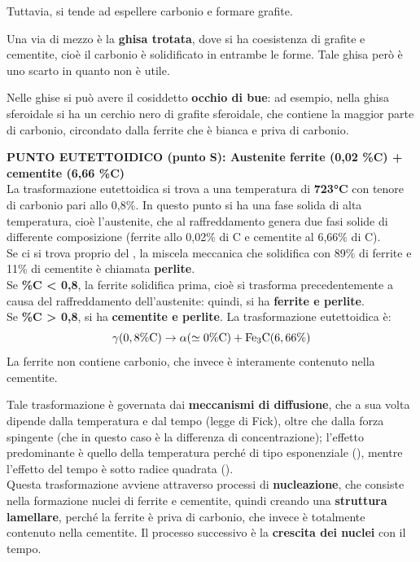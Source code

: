 Tuttavia, si tende ad espellere carbonio e formare grafite.

Una via di mezzo è la \textbf{ghisa trotata}, dove si ha coesistenza di grafite e cementite, cioè il carbonio è solidificato in entrambe le forme. Tale ghisa però è uno scarto in quanto non è utile.

Nelle ghise si può avere il cosiddetto \textbf{occhio di bue}: ad esempio, nella ghisa sferoidale si ha un cerchio nero di grafite sferoidale, che contiene la maggior parte di carbonio, circondato dalla ferrite che è bianca e priva di carbonio.

\textbf{PUNTO EUTETTOIDICO (punto S): Austenite \mathtext{\boldsymbol\gamma \to} ferrite \mathtext{\boldsymbol\alpha} (0,02 \%C) + cementite  (6,66 \%C)}\\
La trasformazione eutettoidica si trova a una temperatura di \textbf{723°C} con tenore di carbonio pari allo 0,8\%. In questo punto si ha una fase solida di alta temperatura, cioè l’austenite, che al raffreddamento genera due fasi solide di differente composizione (ferrite allo 0,02\% di C e cementite al 6,66\% di C).\\
Se ci si trova proprio del , la miscela meccanica che solidifica con 89\% di ferrite e 11\% di cementite è chiamata \textbf{perlite}.\\ 
Se \textbf{\%C < 0,8}, la ferrite \mathtext{\alpha} solidifica prima, cioè si trasforma precedentemente a causa del raffreddamento dell’austenite: quindi, si ha \textbf{ferrite e perlite}.\\
Se \textbf{\%C > 0,8}, si ha \textbf{cementite e perlite}. La trasformazione eutettoidica è:
\begin{equation*}
    \gamma(0,8\%\mbox{$\mathrm{C}$})\to\alpha(\simeq0\%\mbox{$\mathrm{C}$})+\mbox{$\mathrm{Fe_3C(6,66\%)}$}
\end{equation*}
La ferrite \mathtext{\alpha} non contiene carbonio, che invece è interamente contenuto nella cementite.

Tale trasformazione è governata dai \textbf{meccanismi di diffusione}, che a sua volta dipende dalla temperatura e dal tempo (legge di Fick), oltre che dalla forza spingente (che in questo caso è la differenza di concentrazione); l’effetto predominante è quello della temperatura perché di tipo esponenziale (), mentre l’effetto del tempo è sotto radice quadrata ().\\
Questa trasformazione avviene attraverso processi di \textbf{nucleazione}, che consiste nella formazione nuclei di ferrite e cementite, quindi creando una  \textbf{struttura lamellare}, perché la ferrite è priva di carbonio, che invece è totalmente contenuto nella cementite. Il processo successivo è la \textbf{crescita dei nuclei} con il tempo.